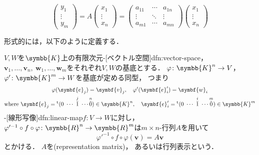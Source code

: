 \documentclass[../sotsu.tex]{subfiles}
\begin{document}
\begin{equation*}
    \begin{pmatrix}
        y_1  \\  \vdots  \\  y_m
    \end{pmatrix}
    =
    A 
    \begin{pmatrix}
        x_1  \\  \vdots  \\  x_n
    \end{pmatrix}
    =
    \begin{pmatrix}
        a_{11} & \cdots & a_{1n}  \\
        \vdots & \ddots & \vdots  \\
        a_{m1} & \cdots & a_{mn}
    \end{pmatrix}
    \begin{pmatrix}
        x_1  \\  \vdots  \\  x_n
    \end{pmatrix}
\end{equation*}

形式的には，以下のように定義する．

\begin{definition}
    $V, W$を$\symbb{K}$上の有限次元-[ベクトル空間]{dfn:vector-space}，
    $\symbf{v}_1, \dots, \symbf{v}_n, \  \symbf{w}_1, \dots, \symbf{w}_m$をそれぞれ$V, W$の基底とする．
    $\varphi  \colon \symbb{K}^n \to V$，
    $\varphi' \colon \symbb{K}^m \to W$を基底が定める同型，
    つまり
    \begin{gather*}
        \varphi (\symbf{e}_j ) = \symbf{v}_j ,
        \quad 
        \varphi'(\symbf{e}'_i) = \symbf{w}_i
        \\
        \text{where } 
        \symbf{e}_j  = \tp{( 0 \  \dotsm \  \overset{j}{\breve{1}} \  \dotsm \overset{n}{\breve{0}} )} \in \symbb{K}^n ,
        \quad
        \symbf{e}'_i = \tp{( 0 \  \dotsm \  \overset{i}{\breve{1}} \  \dotsm \overset{m}{\breve{0}} )} \in \symbb{K}^m
    \end{gather*}
    -[線形写像]{dfn:linear-map}$f \colon V \to W$に対し，
    $\varphi'^{-1} \circ f \circ \varphi \colon \symbb{R}^n \to \symbb{R}^m$は$m \times n$-行列$A$を用いて
    \begin{equation}
        \label{eq:representation-matrix-definition}
        \varphi'^{-1} \circ f \circ \varphi (\symbf{v})
            = A \symbf{v}
    \end{equation}
    とかける．
    $A$を(representation matrix)，
    あるいは行列表示という．
\end{definition}
\end{document}
